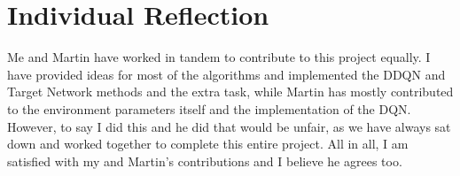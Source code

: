 \renewcommand{\thesection}{Individual Contribution}
\section{Individual Reflection}
Me and Martin have worked in tandem to contribute to this project equally. I have provided ideas for most of the algorithms and implemented the DDQN and Target Network methods and the extra task, while Martin has mostly contributed to the environment parameters itself and the implementation of the DQN. However, to say I did this and he did that would be unfair, as we have always sat down and worked together to complete this entire project. All in all, I am satisfied with my and Martin's contributions and I believe he agrees too.